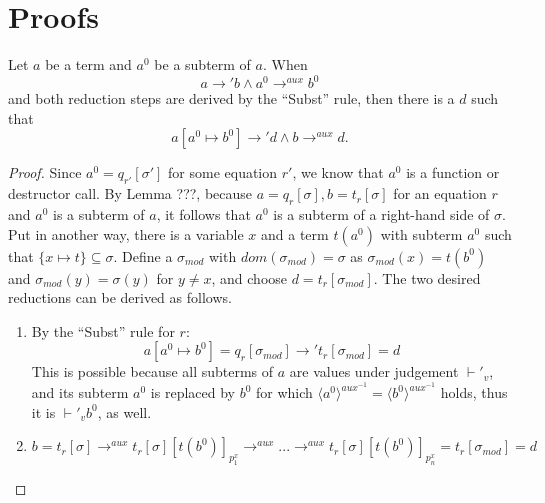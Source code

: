 \chapter{Proofs}

\begin{lemma}
Let $a$ be a term and $a^0$ be a subterm of $a$. When
\[
a \longrightarrow' b \land a^0 \longrightarrow^{aux} b^0
\]
and both reduction steps are derived by the ``Subst'' rule, then there is a $d$ such that
\[
a[a^0 \mapsto b^0] \longrightarrow' d \land b \longrightarrow^{aux} d.
\]

\begin{proof}
Since $a^0 = q_{r'}[\sigma']$ for some equation $r'$, we know that $a^0$ is a function or destructor call. By Lemma ???, because $a = q_r[\sigma], b = t_r[\sigma]$ for an equation $r$ and $a^0$ is a subterm of $a$, it follows that $a^0$ is a subterm of a right-hand side of $\sigma$. Put in another way, there is a variable $x$ and a term $t(a^0)$ with subterm $a^0$ such that $\{x \mapsto t\} \subseteq \sigma$. Define a $\sigma_{mod}$ with $dom(\sigma_{mod}) = \sigma$ as $\sigma_{mod}(x) = t(b^0)$ and $\sigma_{mod}(y) = \sigma(y)$ for $y \neq x$, and choose $d = t_r[\sigma_{mod}]$. The two desired reductions can be derived as follows.
\begin{enumerate}
\item By the ``Subst'' rule for $r$:
\[
a[a^0 \mapsto b^0] = q_r[\sigma_{mod}] \longrightarrow' t_r[\sigma_{mod}] = d
\]
This is possible because all subterms of $a$ are values under judgement $\vdash'_v$, and its subterm $a^0$ is replaced by $b^0$ for which $\langle a^0 \rangle^{aux^{-1}} = \langle b^0 \rangle^{aux^{-1}}$ holds, thus it is $\vdash'_v b^0$, as well.

\item
\[
b = t_r[\sigma] \longrightarrow^{aux} t_r[\sigma][t(b^0)]_{p^x_1} \longrightarrow^{aux} ... \longrightarrow^{aux} t_r[\sigma][t(b^0)]_{p^x_n} = t_r[\sigma_{mod}] = d
\]
\end{enumerate}
\end{proof}
\end{lemma}

